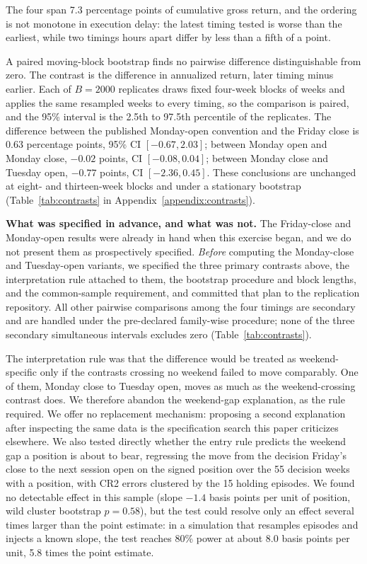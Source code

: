 \documentclass[11pt]{article}
\begin{document}
The four span 7.3 percentage points of cumulative gross return, and the ordering is not monotone in execution delay: the latest timing tested is worse than the earliest, while two timings hours apart differ by less than a fifth of a point.

A paired moving-block bootstrap finds no pairwise difference distinguishable from zero. The contrast is the difference in annualized return, later timing minus earlier. Each of $B = 2000$ replicates draws fixed four-week blocks of weeks and applies the same resampled weeks to every timing, so the comparison is paired, and the 95\% interval is the 2.5th to 97.5th percentile of the replicates. The difference between the published Monday-open convention and the Friday close is $0.63$ percentage points, 95\% CI $[-0.67, 2.03]$; between Monday open and Monday close, $-0.02$ points, CI $[-0.08, 0.04]$; between Monday close and Tuesday open, $-0.77$ points, CI $[-2.36, 0.45]$. These conclusions are unchanged at eight- and thirteen-week blocks and under a stationary bootstrap (Table~\ref{tab:contrasts} in Appendix~\ref{appendix:contrasts}).

\textbf{What was specified in advance, and what was not.} The Friday-close and Monday-open results were already in hand when this exercise began, and we do not present them as prospectively specified. \emph{Before} computing the Monday-close and Tuesday-open variants, we specified the three primary contrasts above, the interpretation rule attached to them, the bootstrap procedure and block lengths, and the common-sample requirement, and committed that plan to the replication repository. All other pairwise comparisons among the four timings are secondary and are handled under the pre-declared family-wise procedure; none of the three secondary simultaneous intervals excludes zero (Table~\ref{tab:contrasts}).

The interpretation rule was that the difference would be treated as weekend-specific only if the contrasts crossing no weekend failed to move comparably. One of them, Monday close to Tuesday open, moves as much as the weekend-crossing contrast does. We therefore abandon the weekend-gap explanation, as the rule required. We offer no replacement mechanism: proposing a second explanation after inspecting the same data is the specification search this paper criticizes elsewhere. We also tested directly whether the entry rule predicts the weekend gap a position is about to bear, regressing the move from the decision Friday's close to the next session open on the signed position over the 55 decision weeks with a position, with CR2 errors clustered by the 15 holding episodes. We found no detectable effect in this sample (slope $-1.4$ basis points per unit of position, wild cluster bootstrap $p = 0.58$), but the test could resolve only an effect several times larger than the point estimate: in a simulation that resamples episodes and injects a known slope, the test reaches 80\% power at about 8.0 basis points per unit, 5.8 times the point estimate.
\end{document}
